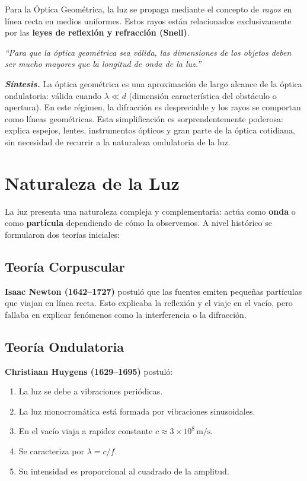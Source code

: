 \documentclass[12pt, a4paper]{article}
\theoremstyle{definition}
\newcommand{\nota}[1]{\medskip\noindent\colorbox{grisclaro}{\parbox{0.95\linewidth}{\textit{#1}}}\medskip}
\begin{document}
Para la Óptica Geométrica, la luz se propaga mediante el concepto de \textit{rayos} en línea
recta en medios uniformes. Estos rayos están relacionados exclusivamente por las \textbf{leyes
de reflexión y refracción (Snell)}.

\nota{``Para que la óptica geométrica sea válida, las dimensiones de los objetos deben ser
mucho mayores que la longitud de onda de la luz.''}

\textit{\textbf{Síntesis.}} La óptica geométrica es una aproximación de largo alcance de la
óptica ondulatoria: válida cuando \(\lambda \ll d\) (dimensión característica del obstáculo o
apertura). En este régimen, la difracción es despreciable y los rayos se comportan como líneas
geométricas. Esta simplificación es sorprendentemente poderosa: explica espejos, lentes,
instrumentos ópticos y gran parte de la óptica cotidiana, sin necesidad de recurrir a la
naturaleza ondulatoria de la luz.

\section{Naturaleza de la Luz}
\label{sec:naturaleza_luz}

La luz presenta una naturaleza compleja y complementaria: actúa como \textbf{onda} o como
\textbf{partícula} dependiendo de cómo la observemos. A nivel histórico se formularon dos
teorías iniciales:

\subsection{Teoría Corpuscular}

\textbf{Isaac Newton (1642--1727)} postuló que las fuentes emiten pequeñas partículas que
viajan en línea recta. Esto explicaba la reflexión y el viaje en el vacío, pero fallaba en
explicar fenómenos como la interferencia o la difracción.

\subsection{Teoría Ondulatoria}

\textbf{Christiaan Huygens (1629--1695)} postuló:

\begin{enumerate}[label=\arabic*.]
  \item La luz se debe a vibraciones periódicas.
  \item La luz monocromática está formada por vibraciones sinusoidales.
  \item En el vacío viaja a rapidez constante \(c \approx 3 \times 10^8\,\text{m/s}\).
  \item Se caracteriza por \(\lambda = c/f\).
  \item Su intensidad es proporcional al cuadrado de la amplitud.
\end{enumerate}
\end{document}
